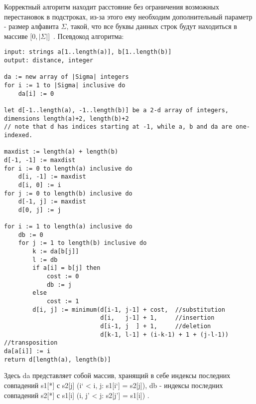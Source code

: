 Корректный алгоритм находит расстояние без ограничения возможных перестановок в подстроках, из-за этого ему необходим дополнительный параметр - размер алфавита $\Sigma$, такой, что все буквы данных строк будут находиться в массиве $[0, |\Sigma|$]~\cite{damerau2}. Псевдокод алгоритма:

\begin{lstlisting}
input: strings a[1..length(a)], b[1..length(b)]
output: distance, integer

da := new array of |Sigma| integers
for i := 1 to |Sigma| inclusive do
	da[i] := 0

let d[-1..length(a), -1..length(b)] be a 2-d array of integers, dimensions length(a)+2, length(b)+2
// note that d has indices starting at -1, while a, b and da are one-indexed.

maxdist := length(a) + length(b)
d[-1, -1] := maxdist
for i := 0 to length(a) inclusive do
	d[i, -1] := maxdist
	d[i, 0] := i
for j := 0 to length(b) inclusive do
	d[-1, j] := maxdist
	d[0, j] := j

for i := 1 to length(a) inclusive do
	db := 0
	for j := 1 to length(b) inclusive do
		k := da[b[j]]
		l := db
		if a[i] = b[j] then
			cost := 0
			db := j
		else
			cost := 1
		d[i, j] := minimum(d[i-1, j-1] + cost,  //substitution
						   d[i,   j-1] + 1,     //insertion
						   d[i-1, j  ] + 1,     //deletion
						   d[k-1, l-1] + (i-k-1) + 1 + (j-l-1)) //transposition
da[a[i]] := i
return d[length(a), length(b)]
\end{lstlisting}

Здесь da представляет собой массив, хранящий в себе индексы последних совпадений s1[*] с s2[j] (i` < i, j: s1[i`] = s2[j]), db - индексы последних совпадений s2[*] с s1[i] (i, j' < j: s2[j'] = s1[i]) .
